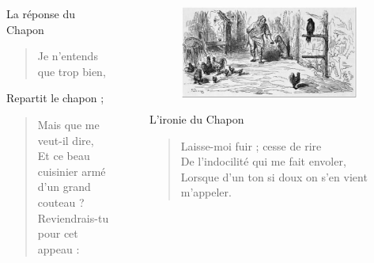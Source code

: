 \documentclass{LaBRI_poster}
\begin{document}
\begin{frame}[t]
\begin{columns}[t]
\begin{column}{\fourcolwidth}
\begin{block}{La réponse du Chapon}

\begin{quote}
Je n’entends que trop bien,
\end{quote}
Repartit le chapon ; 

\begin{quote}
Mais que me veut-il dire,\\
Et ce beau cuisinier armé d’un grand couteau ?\\
Reviendrais-tu pour cet appeau :
\end{quote}
\end{block}


\end{column}

\begin{column}{\sepwidth}\end{column} %

\begin{column}{\twocolwidth}

\begin{figure}
\includegraphics[width=\textwidth]{le-faucon-et-le-chapon-gustave-dore.jpg}
\end{figure}

\begin{block}{L'ironie du Chapon}
\begin{quote}

Laisse-moi fuir ; cesse de rire\\
De l’indocilité qui me fait envoler,\\
Lorsque d’un ton si doux on s’en vient m’appeler.
\end{quote}
\end{block}

\end{column}

\begin{column}{\sepwidth}\end{column} %


\end{columns}
\end{frame}
\end{document}
